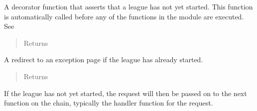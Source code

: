 \documentclass[letterpaper,10pt,english]{sphinxmanual}
\begin{document}

\begin{fulllineitems}
\label{\detokenize{tiger_leagues/readme:tiger_leagues.admin.league_not_started}}
A decorator function that asserts that a league has not yet started. This 
function is automatically called before any of the functions in the 
 module are executed. See 
\begin{quote}\begin{description}
\item[{Returns}] \leavevmode
{}

\end{description}\end{quote}

A redirect to an exception page if the league has already started.
\begin{quote}\begin{description}
\item[{Returns}] \leavevmode
{}

\end{description}\end{quote}

If the league has not yet started, the request will 
then be passed on to the next function on the chain, typically the handler 
function for the request.

\end{fulllineitems}

\end{document}
